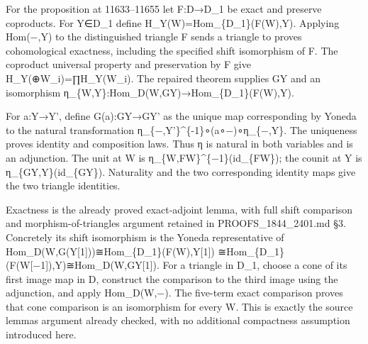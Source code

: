For the proposition at 11633–\allowbreak{}11655 let F:\allowbreak{}D\allowbreak{}→D\_\allowbreak{}1 be exact and preserve coproducts. For Y\allowbreak{}∈D\_\allowbreak{}1 define H\_\allowbreak{}Y(W)\allowbreak{}\allowbreak{}=Hom\_\allowbreak{}\{D\_\allowbreak{}1\}(F(W)\allowbreak{},\allowbreak{}Y)\allowbreak{}. Applying Hom(−,\allowbreak{}Y)\allowbreak{} to the distinguished triangle F sends a triangle to proves cohomological exactness,\allowbreak{} including the specified shift isomorphism of F. The coproduct universal property and preservation by F give H\_\allowbreak{}Y(\allowbreak{}⊕W\_\allowbreak{}i)\allowbreak{}\allowbreak{}=∏H\_\allowbreak{}Y(W\_\allowbreak{}i)\allowbreak{}. The repaired theorem supplies GY and an isomorphism η\_\allowbreak{}\{W,\allowbreak{}Y\}:\allowbreak{}Hom\_\allowbreak{}D(W,\allowbreak{}GY)\allowbreak{}\allowbreak{}→Hom\_\allowbreak{}\{D\_\allowbreak{}1\}(F(W)\allowbreak{},\allowbreak{}Y)\allowbreak{}.

For a:\allowbreak{}Y\allowbreak{}→Y',\allowbreak{} define G(a)\allowbreak{}:\allowbreak{}GY\allowbreak{}→GY' as the unique map corresponding by Yoneda to the natural transformation η\_\allowbreak{}\{−,\allowbreak{}Y'\}\textasciicircum{}\{-1\}∘(a∘−)\allowbreak{}∘η\_\allowbreak{}\{−,\allowbreak{}Y\}. The uniqueness proves identity and composition laws. Thus η is natural in both variables and is an adjunction. The unit at W is η\_\allowbreak{}\{W,\allowbreak{}FW\}\textasciicircum{}\{−1\}(id\_\allowbreak{}\{FW\})\allowbreak{}; the counit at Y is η\_\allowbreak{}\{GY,\allowbreak{}Y\}(id\_\allowbreak{}\{GY\})\allowbreak{}. Naturality and the two corresponding identity maps give the two triangle identities.

Exactness is the already proved exact-adjoint lemma,\allowbreak{} with full shift comparison and morphism-of-triangles argument retained in PROOFS\_\allowbreak{}1844\_\allowbreak{}2401.md §3. Concretely its shift isomorphism is the Yoneda representative of Hom\_\allowbreak{}D(W,\allowbreak{}G(Y[1]\allowbreak{})\allowbreak{})\allowbreak{}≅Hom\_\allowbreak{}\{D\_\allowbreak{}1\}(F(W)\allowbreak{},\allowbreak{}Y[1]\allowbreak{})\allowbreak{} ≅Hom\_\allowbreak{}\{D\_\allowbreak{}1\}(F(W[−1]\allowbreak{})\allowbreak{},\allowbreak{}Y)\allowbreak{}≅Hom\_\allowbreak{}D(W,\allowbreak{}GY[1]\allowbreak{})\allowbreak{}. For a triangle in D\_\allowbreak{}1,\allowbreak{} choose a cone of its first image map in D,\allowbreak{} construct the comparison to the third image using the adjunction,\allowbreak{} and apply Hom\_\allowbreak{}D(W,\allowbreak{}−)\allowbreak{}. The five-term exact comparison proves that cone comparison is an isomorphism for every W. This is exactly the source lemma\textquotesingle s argument already checked,\allowbreak{} with no additional compactness assumption introduced here.

